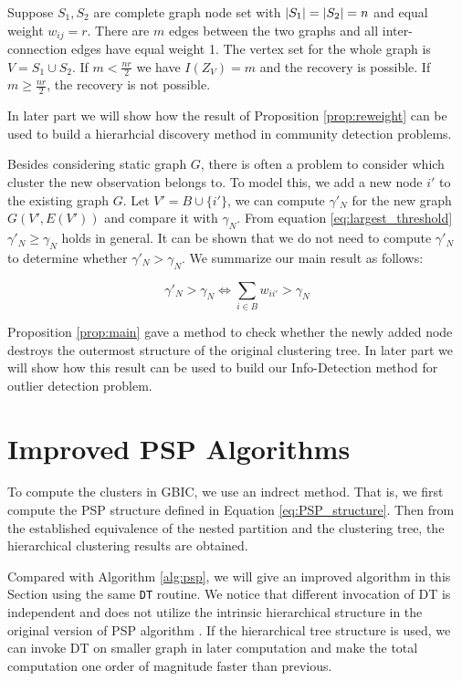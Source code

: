 \begin{proposition}\label{prop:reweight}
Suppose $S_1, S_2 $ are complete graph node set with $\lvert S_1\rvert=\lvert S_2\rvert=n$ and equal weight $w_{ij}=r$. There are $m$ edges between the two graphs and all inter-connection edges have equal weight 1. The vertex set for the whole graph is $V=S_1\cup S_2$. If $m <\frac{nr}{2}$  we have
$I(Z_V) = 
m$ and the recovery is possible. If $m\geq \frac{nr}{2}$, the recovery is not possible.
\end{proposition}

In later part we will show how the result of Proposition \ref{prop:reweight} can be used to build a hierarhcial discovery method in community detection problems.

Besides considering static graph $G$, there is often a problem to consider which cluster the new observation belongs to.
To model this, we add a new node $i'$ to the existing graph $G$.
Let $V'=B \cup \{i'\}$, we can compute $\gamma'_N$ for the new graph $G(V', E(V'))$ and compare it with $\gamma_N$. From equation \eqref{eq:largest_threshold} $\gamma'_N \geq \gamma_N$ holds in general. It can be shown that we do not need to compute $\gamma'_N$ to determine whether $\gamma'_N>\gamma_N$. We summarize our main result as follows:
\begin{proposition}\label{prop:main}
\begin{equation}
\gamma'_N > \gamma_N \iff  \sum_{i \in B} w_{ii'} > \gamma_N 
\end{equation}
\end{proposition}
Proposition \ref{prop:main} gave a method to check whether the newly added node destroys the outermost structure of the original clustering tree.  In later part we will show how this result can be used to build our Info-Detection method for outlier detection problem.
\section{Improved PSP Algorithms}\label{sec:alg}
To compute the clusters in GBIC, we use an indrect method. That is, we first compute the PSP structure defined in Equation \eqref{eq:PSP_structure}. Then from the established equivalence of the nested partition and the clustering tree, the hierarchical
clustering results are obtained.

Compared with Algorithm \ref{alg:psp}, we will give an improved algorithm in this Section using the same \texttt{DT} routine. We notice that different invocation of DT is independent and does not utilize the intrinsic hierarchical structure in the original version of PSP algorithm \cite{RN3}. If the hierarchical tree structure is used, we can invoke DT on smaller graph in later computation and make the total computation one order of magnitude faster than previous.

